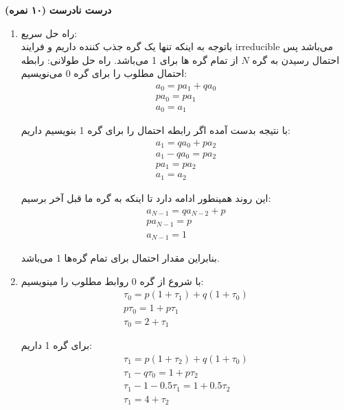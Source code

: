 \Large \textbf{درست نادرست}
\large \textbf{(۱۰ نمره)}

\normalsize \vspace{0.5cm}

\begin{enumerate}[label=(\alph*)]
	\item
	راه حل سریع:\\
	
	باتوجه به اینکه تنها یک گره جذب کننده داریم و فرایند irreducible می‌باشد پس احتمال رسیدن به گره $N$ از تمام گره ها برای 1 می‌باشد.
	راه حل طولانی:
	رابطه احتمال مطلوب را برای گره 0 می‌نویسیم:
	$$
	\begin{array}{c}
		{a_0} = p{a_1} + q{a_0}\\
		p{a_0} = p{a_1}\\
		{a_0} = {a_1}
	\end{array}
	$$
	
	با نتیجه بدست آمده اگر رابطه احتمال را برای گره 1 بنویسیم داریم:
	$$
	\begin{array}{c}
		{a_1} = q{a_0} + p{a_2}\\
		{a_1} - q{a_0} = p{a_2}\\
		p{a_1} = p{a_2}\\
		{a_1} = {a_2}
	\end{array}
	$$
	
	این روند همینطور ادامه دارد تا اینکه به گره ما قبل آخر برسیم:
	$$
	\begin{array}{c}
		{a_{N - 1}} = q{a_{N - 2}} + p\\
		p{a_{N - 1}} = p\\
		{a_{N - 1}} = 1
	\end{array}
	$$
	
	بنابراین مقدار احتمال برای تمام گره‌ها 1 می‌باشد.
	
	\item
	
	با شروع از گره 0 روابط مطلوب را مینویسیم:
	$$
	\begin{array}{c}
		{\tau _0} = p(1 + {\tau _1}) + q(1 + {\tau _0})\\
		p{\tau _0} = 1 + p{\tau _1}\\
		{\tau _0} = 2 + {\tau _1}
	\end{array}
	$$
	
	‌برای گره 1 داریم:
	$$
	\begin{array}{c}
		{\tau _1} = p(1 + {\tau _2}) + q(1 + {\tau _0})\\
		{\tau _1} - q{\tau _0} = 1 + p{\tau _2}\\
		{\tau _1} - 1 - 0.5{\tau _1} = 1 + 0.5{\tau _2}\\
		{\tau _1} = 4 + {\tau _2}
	\end{array}
	$$
	

\end{enumerate}
